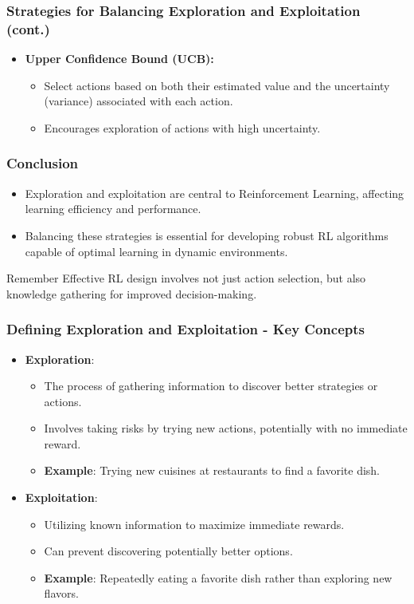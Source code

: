 \documentclass[aspectratio=169]{beamer}
\begin{document}
\begin{frame}[fragile]
    \frametitle{Strategies for Balancing Exploration and Exploitation (cont.)}
    \begin{itemize}
        \item \textbf{Upper Confidence Bound (UCB):}
            \begin{itemize}
                \item Select actions based on both their estimated value and the uncertainty (variance) associated with each action.
                \item Encourages exploration of actions with high uncertainty.
            \end{itemize}
    \end{itemize}
\end{frame}

\begin{frame}[fragile]
    \frametitle{Conclusion}
    \begin{itemize}
        \item Exploration and exploitation are central to Reinforcement Learning, affecting learning efficiency and performance.
        \item Balancing these strategies is essential for developing robust RL algorithms capable of optimal learning in dynamic environments.
    \end{itemize}
    \begin{block}{Remember}
        Effective RL design involves not just action selection, but also knowledge gathering for improved decision-making.
    \end{block}
\end{frame}

\begin{frame}[fragile]
    \frametitle{Defining Exploration and Exploitation - Key Concepts}
    \begin{itemize}
        \item \textbf{Exploration}: 
        \begin{itemize}
            \item The process of gathering information to discover better strategies or actions.
            \item Involves taking risks by trying new actions, potentially with no immediate reward.
            \item \textbf{Example}: Trying new cuisines at restaurants to find a favorite dish.
        \end{itemize}
        
        \item \textbf{Exploitation}:
        \begin{itemize}
            \item Utilizing known information to maximize immediate rewards.
            \item Can prevent discovering potentially better options.
            \item \textbf{Example}: Repeatedly eating a favorite dish rather than exploring new flavors.
        \end{itemize}
    \end{itemize}
\end{frame}
\end{document}
